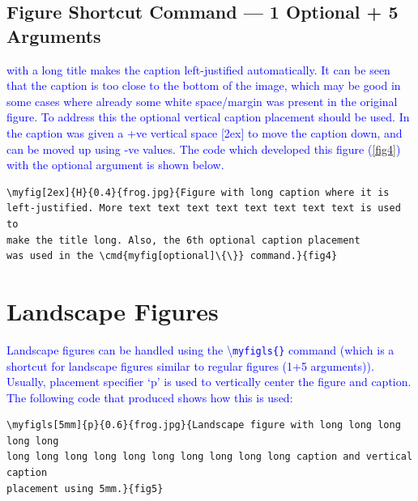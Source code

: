 \documentclass[phd]{ndsu-thesis-2022}
\newcommand\italk[1]{\textcolor{blue}{#1}}  %
\newcommand\cmd[1]{\textbackslash\texttt{#1}}  %
\begin{document}
\subsection{Figure Shortcut Command --- 1 Optional + 5 Arguments}


\italk{ with a long title makes the caption left-justified automatically. It can be seen that the caption is too close to the bottom of the image, which may be good in some cases where already some white space/margin was present in the original figure. To address this the optional vertical caption placement should be used. In \Cref{fig4} the caption was given a +ve vertical space [2ex] to move the caption down, and can be moved up using -ve values. The code which developed this figure (\cref{fig4}) with the optional argument is shown below.
}

{\singlespacing
\begin{verbatim}
\myfig[2ex]{H}{0.4}{frog.jpg}{Figure with long caption where it is 
left-justified. More text text text text text text text text is used to 
make the title long. Also, the 6th optional caption placement 
was used in the \cmd{myfig[optional]\{\}} command.}{fig4}
\end{verbatim}
}


\section{Landscape Figures}

\italk{Landscape figures can be handled using the \cmd{myfigls\{\}} command (which is a shortcut for landscape figures similar to regular figures (1+5 arguments)). Usually, placement specifier `p' is used to vertically center the figure and caption. The following code that produced \Cref{fig5} shows how this is used:}

\vspace{-4ex}
{\singlespace
\begin{verbatim}
\myfigls[5mm]{p}{0.6}{frog.jpg}{Landscape figure with long long long long long
long long long long long long long long long long caption and vertical caption
placement using 5mm.}{fig5}
\end{verbatim}
}
\end{document}
